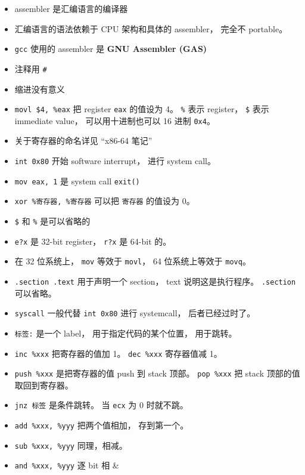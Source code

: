 \begin{itemize}
\item assembler 是汇编语言的编译器
\item 汇编语言的语法依赖于 CPU 架构和具体的 assembler， 完全不 portable。
\item \verb|gcc| 使用的 assembler 是 \textbf{GNU Assembler (GAS)}
\item 注释用 \verb|#|
\item 缩进没有意义
\item \verb|movl $4, %eax| 把 register \verb|eax| 的值设为 4。 \verb|%| 表示 register， \verb|$| 表示 immediate value， 可以用十进制也可以 16 进制 \verb|0x4|。
\item 关于寄存器的命名详见 “x86-64 笔记”
\item \verb|int 0x80| 开始 software interrupt， 进行 system call。
\item \verb|mov eax, 1| 是 system call \verb|exit()|
\item \verb|xor %寄存器, %寄存器| 可以把 \verb|寄存器| 的值设为 0。
\item \verb|$| 和 \verb|%| 是可以省略的
\item \verb|e?x| 是 32-bit register， \verb|r?x| 是 64-bit 的。
\item 在 32 位系统上， \verb|mov| 等效于 \verb|movl|， 64 位系统上等效于 \verb|movq|。
\item \verb|.section .text| 用于声明一个 section， text 说明这是执行程序。 \verb|.section| 可以省略。
\item \verb|syscall| 一般代替 \verb|int 0x80| 进行 systemcall， 后者已经过时了。
\item \verb|标签:| 是一个 label， 用于指定代码的某个位置， 用于跳转。
\item \verb|inc %xxx| 把寄存器的值加 1。 \verb|dec %xxx| 寄存器值减 1。
\item \verb|push %xxx| 是把寄存器的值 push 到 stack 顶部。 \verb|pop %xxx| 把 stack 顶部的值取回到寄存器。
\item \verb|jnz 标签| 是条件跳转。 当 \verb|ecx| 为 0 时就不跳。
\item \verb|add %xxx, %yyy| 把两个值相加， 存到第一个。
\item \verb|sub %xxx, %yyy| 同理，相减。
\item \verb|and %xxx, %yyy| 逐 bit 相 \&
\end{itemize}

